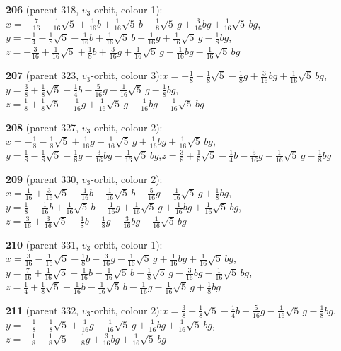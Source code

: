 \documentclass[10pt]{article}
\begin{document}
{\noindent\textbf{206} (parent 318, $v_3$-orbit, colour 1):\quad $x=-\tfrac{7}{16}-\tfrac{1}{16}\sqrt5+\tfrac{1}{16}b+\tfrac{1}{16}\sqrt5\,b+\tfrac{1}{8}\sqrt5\,g+\tfrac{3}{16}bg+\tfrac{1}{16}\sqrt5\,bg$,\quad $y=-\tfrac{1}{4}-\tfrac{1}{8}\sqrt5-\tfrac{1}{16}b+\tfrac{1}{16}\sqrt5\,b+\tfrac{1}{16}g+\tfrac{1}{16}\sqrt5\,g-\tfrac{1}{8}bg$,\quad $z=-\tfrac{3}{16}+\tfrac{1}{16}\sqrt5+\tfrac{1}{8}b+\tfrac{3}{16}g+\tfrac{1}{16}\sqrt5\,g-\tfrac{1}{16}bg-\tfrac{1}{16}\sqrt5\,bg$\par\smallskip
\noindent\textbf{207} (parent 323, $v_3$-orbit, colour 3):\quad $x=-\tfrac{1}{8}+\tfrac{1}{8}\sqrt5-\tfrac{1}{8}g+\tfrac{3}{16}bg+\tfrac{1}{16}\sqrt5\,bg$,\quad $y=\tfrac{3}{8}+\tfrac{1}{8}\sqrt5-\tfrac{1}{4}b-\tfrac{5}{16}g-\tfrac{1}{16}\sqrt5\,g-\tfrac{1}{8}bg$,\quad $z=\tfrac{1}{8}+\tfrac{1}{8}\sqrt5-\tfrac{1}{16}g+\tfrac{1}{16}\sqrt5\,g-\tfrac{1}{16}bg-\tfrac{1}{16}\sqrt5\,bg$\par\smallskip
\noindent\textbf{208} (parent 327, $v_3$-orbit, colour 2):\quad $x=-\tfrac{1}{8}-\tfrac{1}{8}\sqrt5+\tfrac{1}{16}g-\tfrac{1}{16}\sqrt5\,g+\tfrac{1}{16}bg+\tfrac{1}{16}\sqrt5\,bg$,\quad $y=\tfrac{1}{8}-\tfrac{1}{8}\sqrt5+\tfrac{1}{8}g-\tfrac{3}{16}bg-\tfrac{1}{16}\sqrt5\,bg$,\quad $z=\tfrac{3}{8}+\tfrac{1}{8}\sqrt5-\tfrac{1}{4}b-\tfrac{5}{16}g-\tfrac{1}{16}\sqrt5\,g-\tfrac{1}{8}bg$\par\smallskip
\noindent\textbf{209} (parent 330, $v_3$-orbit, colour 2):\quad $x=\tfrac{1}{16}+\tfrac{3}{16}\sqrt5-\tfrac{1}{16}b-\tfrac{1}{16}\sqrt5\,b-\tfrac{5}{16}g-\tfrac{1}{16}\sqrt5\,g+\tfrac{1}{8}bg$,\quad $y=\tfrac{1}{8}-\tfrac{1}{16}b+\tfrac{1}{16}\sqrt5\,b-\tfrac{1}{16}g+\tfrac{1}{16}\sqrt5\,g+\tfrac{1}{16}bg+\tfrac{1}{16}\sqrt5\,bg$,\quad $z=\tfrac{3}{16}+\tfrac{3}{16}\sqrt5-\tfrac{1}{8}b-\tfrac{1}{8}g-\tfrac{3}{16}bg-\tfrac{1}{16}\sqrt5\,bg$\par\smallskip
\noindent\textbf{210} (parent 331, $v_3$-orbit, colour 1):\quad $x=\tfrac{3}{16}-\tfrac{1}{16}\sqrt5-\tfrac{1}{8}b-\tfrac{3}{16}g-\tfrac{1}{16}\sqrt5\,g+\tfrac{1}{16}bg+\tfrac{1}{16}\sqrt5\,bg$,\quad $y=\tfrac{7}{16}+\tfrac{1}{16}\sqrt5-\tfrac{1}{16}b-\tfrac{1}{16}\sqrt5\,b-\tfrac{1}{8}\sqrt5\,g-\tfrac{3}{16}bg-\tfrac{1}{16}\sqrt5\,bg$,\quad $z=\tfrac{1}{4}+\tfrac{1}{8}\sqrt5+\tfrac{1}{16}b-\tfrac{1}{16}\sqrt5\,b-\tfrac{1}{16}g-\tfrac{1}{16}\sqrt5\,g+\tfrac{1}{8}bg$\par\smallskip
\noindent\textbf{211} (parent 332, $v_3$-orbit, colour 2):\quad $x=\tfrac{3}{8}+\tfrac{1}{8}\sqrt5-\tfrac{1}{4}b-\tfrac{5}{16}g-\tfrac{1}{16}\sqrt5\,g-\tfrac{1}{8}bg$,\quad $y=-\tfrac{1}{8}-\tfrac{1}{8}\sqrt5+\tfrac{1}{16}g-\tfrac{1}{16}\sqrt5\,g+\tfrac{1}{16}bg+\tfrac{1}{16}\sqrt5\,bg$,\quad $z=-\tfrac{1}{8}+\tfrac{1}{8}\sqrt5-\tfrac{1}{8}g+\tfrac{3}{16}bg+\tfrac{1}{16}\sqrt5\,bg$\par\smallskip
}
\end{document}
